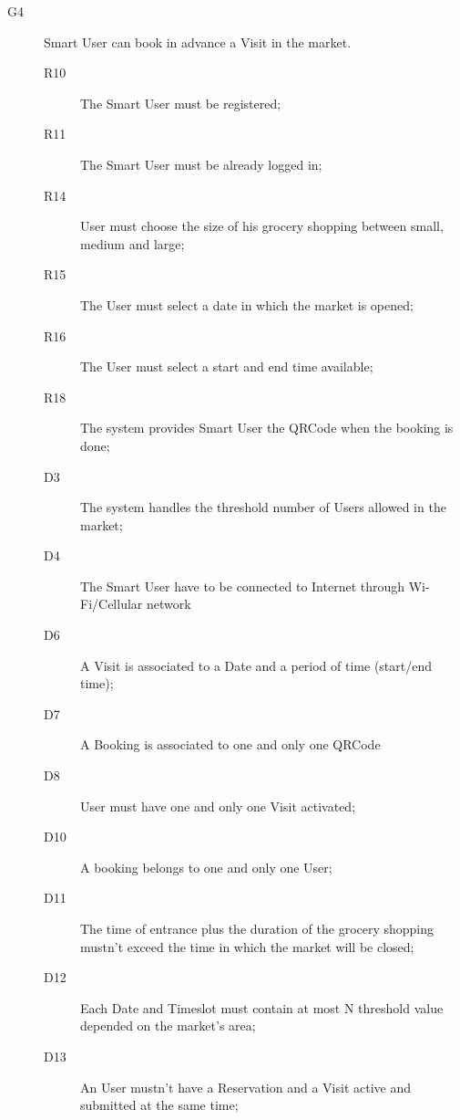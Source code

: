 \begin{description}
    \item[G4]Smart User can book in advance a Visit in the market.
    \begin{description}
    \item[R10] The Smart User must be registered;
    \item[R11] The Smart User must be already logged in;
    \item[R14] User must choose the size of his grocery shopping between small, medium and large;
    \item[R15] The User must select a date in which the market is opened;
    \item[R16] The User must select a start and end time available;
    \item[R18] The system provides Smart User the QRCode when the booking is done;
    \item[D3] The system handles the threshold number of Users allowed in the market;
    \item[D4] The Smart User have to be connected to Internet through Wi-Fi/Cellular network
    \item[D6] A Visit is associated to a Date and a period of time (start/end time);
    \item[D7] A Booking is associated to one and only one QRCode
    \item[D8] User must have one and only one Visit activated;
    \item[D10] A booking belongs to one and only one User;
    \item[D11] The time of entrance plus the duration of the grocery shopping mustn’t exceed the time in which the market will be closed; 
    \item[D12] Each Date and Timeslot must contain at most N threshold value depended on the market's area;
    \item[D13] An User mustn’t have a Reservation and a Visit active and submitted at the same time; 
    \end{description}
    

\end{description}
